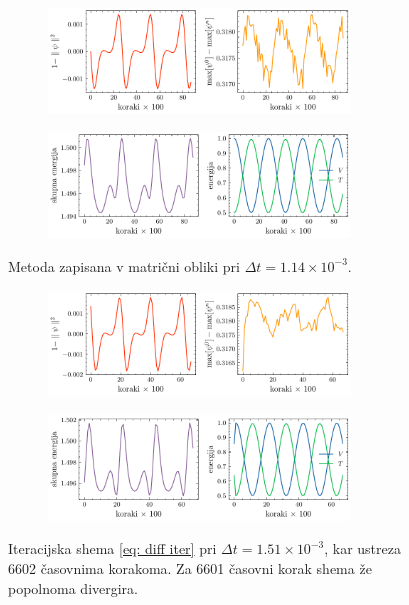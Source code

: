 \documentclass[11pt]{report}
\begin{document}
\begin{figure}[h!]
	\centering
	\begin{subfigure}[b]{\textwidth}
		\centering
		\includegraphics[width=0.88\textwidth]{norm_max_matrix_diff.pdf}
		\label{fig: < >}
	\end{subfigure}
	\hfill
	\begin{subfigure}[b]{1\textwidth}
		\centering
		\includegraphics[width=0.88\textwidth]{E_matrix_diff.pdf}
		\label{fig: < >}
	\end{subfigure}
	\caption{Metoda zapisana v matrični obliki pri $\Delta t=1.14 \times 10^{-3}$.}
	\label{fig: 4}
\end{figure}

\newpage

\begin{figure}[h!]
	\centering
	\begin{subfigure}[b]{\textwidth}
		\centering
		\includegraphics[width=0.88\textwidth]{norm_max_iter_diff.pdf}
		\label{fig: < >}
	\end{subfigure}
	\hfill
	\begin{subfigure}[b]{\textwidth}
		\centering
		\includegraphics[width=0.88\textwidth]{E_iter_diff.pdf}
		\label{fig: < >}
	\end{subfigure}
	\caption{Iteracijska shema \ref{eq: diff iter} pri $\Delta t=1.51 \times 10^{-3}$, kar ustreza 6602 časovnima korakoma.
		Za 6601 časovni korak shema že popolnoma divergira.}
	\label{fig: 5}
\end{figure}
\end{document}
